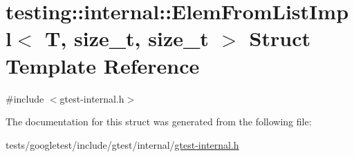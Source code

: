 \hypertarget{structtesting_1_1internal_1_1ElemFromListImpl}{}\section{testing\+:\+:internal\+:\+:Elem\+From\+List\+Impl$<$ T, size\+\_\+t, size\+\_\+t $>$ Struct Template Reference}
\label{structtesting_1_1internal_1_1ElemFromListImpl}


{\ttfamily \#include $<$gtest-\/internal.\+h$>$}



The documentation for this struct was generated from the following file\+:\begin{DoxyCompactItemize}
\item 
tests/googletest/include/gtest/internal/\hyperlink{gtest-internal_8h}{gtest-\/internal.\+h}\end{DoxyCompactItemize}
